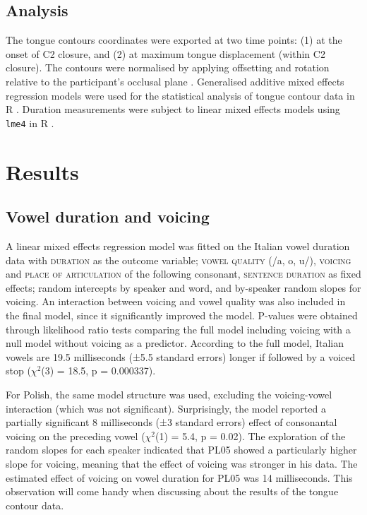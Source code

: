 \documentclass[authoryear, twocolumn]{elsarticle}
\begin{document}
\subsection{Analysis}\label{analysis}

The tongue contours coordinates were exported at two time points: (1) at
the onset of C2 closure, and (2) at maximum tongue displacement (within
C2 closure). The contours were normalised by applying offsetting and
rotation relative to the participant's occlusal plane
\citep{scobbie2011}. Generalised additive mixed effects regression
models \citep[GAMMs,][]{wood2006} were used for the statistical analysis
of tongue contour data in R \citep{r-core-team2017}. Duration
measurements were subject to linear mixed effects models using
\texttt{lme4} in R \citep{bates2015}.

\section{Results}\label{results}

\subsection{Vowel duration and
voicing}\label{vowel-duration-and-voicing}

A linear mixed effects regression model was fitted on the Italian vowel
duration data with \textsc{duration} as the outcome variable;
\textsc{vowel quality} (/a, o, u/), \textsc{voicing} and
\textsc{place of articulation} of the following consonant,
\textsc{sentence duration} as fixed effects; random intercepts by
speaker and word, and by-speaker random slopes for voicing. An
interaction between voicing and vowel quality was also included in the
final model, since it significantly improved the model. P-values were
obtained through likelihood ratio tests comparing the full model
including voicing with a null model without voicing as a predictor.
According to the full model, Italian vowels are 19.5 milliseconds (±5.5
standard errors) longer if followed by a voiced stop (\(\chi^2\)(3) =
18.5, p = 0.000337).

For Polish, the same model structure was used, excluding the
voicing-vowel interaction (which was not significant). Surprisingly, the
model reported a partially significant 8 milliseconds (±3 standard
errors) effect of consonantal voicing on the preceding vowel
(\(\chi^2\)(1) = 5.4, p = 0.02). The exploration of the random slopes
for each speaker indicated that PL05 showed a particularly higher slope
for voicing, meaning that the effect of voicing was stronger in his
data. The estimated effect of voicing on vowel duration for PL05 was 14
milliseconds. This observation will come handy when discussing about the
results of the tongue contour data.
\end{document}
